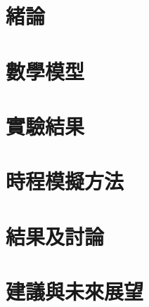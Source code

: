 

\chapter{緒論} \label{ch:1-introduction}
	

\chapter{數學模型} \label{ch:2-background}
	

\chapter{實驗結果} \label{ch:3-proposed}
	
	
\chapter{時程模擬方法} \label{ch:4-evaluation}
	
	
\chapter{結果及討論} \label{ch:5-conclusion}
	
	
\chapter{建議與未來展望} \label{ch:6-futureworks}
	

